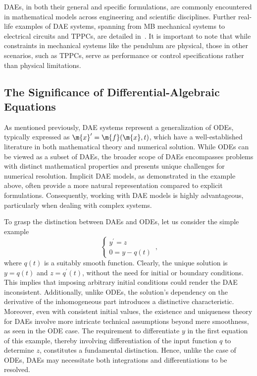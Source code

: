 %
\acp{DAE}, in both their general and specific formulations, are commonly encountered in mathematical models across engineering and scientific disciplines. Further real-life examples of \ac{DAE} systems, spanning from \ac{MB} mechanical systems to electrical circuits and \acp{TPPC}, are detailed in~\cite{brenan1995numerical}. It is important to note that while constraints in mechanical systems like the pendulum are physical, those in other scenarios, such as \acp{TPPC}, serve as performance or control specifications rather than physical limitations.

\subsection{The Significance of Differential-Algebraic Equations}

As mentioned previously, \ac{DAE} systems represent a generalization of \acp{ODE}, typically expressed as $\m{x}^{\prime} = \m{f}(\m{x}, t)$, which have a well-established literature in both mathematical theory and numerical solution. While \acp{ODE} can be viewed as a subset of \acp{DAE}, the broader scope of \acp{DAE} encompasses problems with distinct mathematical properties and presents unique challenges for numerical resolution. Implicit \ac{DAE} models, as demonstrated in the example above, often provide a more natural representation compared to explicit formulations. Consequently, working with \ac{DAE} models is highly advantageous, particularly when dealing with complex systems.

To grasp the distinction between \acp{DAE} and \acp{ODE}, let us consider the simple example
%
\begin{equation*}
  \begin{cases}
  y^{\prime} = z \\
  0 = y - q(t)
  \end{cases} \, \text{,}
\end{equation*}
%
where $q(t)$ is a suitably smooth function. Clearly, the unique solution is $y = q(t)$ and $z = q^{\prime}(t)$, without the need for initial or boundary conditions. This implies that imposing arbitrary initial conditions could render the \ac{DAE} inconsistent. Additionally, unlike \acp{ODE}, the solution's dependency on the derivative of the inhomogeneous part introduces a distinctive characteristic. Moreover, even with consistent initial values, the existence and uniqueness theory for \acp{DAE} involve more intricate technical assumptions beyond mere smoothness, as seen in the \ac{ODE} case. The requirement to differentiate $y$ in the first equation of this example, thereby involving differentiation of the input function $q$ to determine $z$, constitutes a fundamental distinction. Hence, unlike the case of \acp{ODE}, \acp{DAE} may necessitate both integrations and differentiations to be resolved.

